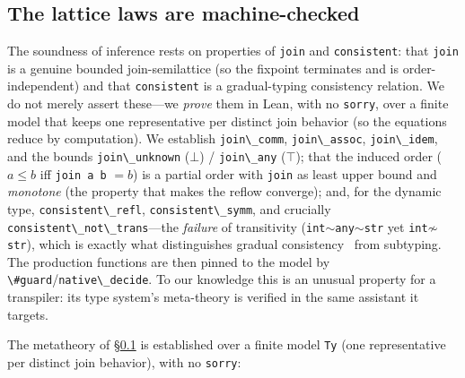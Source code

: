 \documentclass{article}
\newcommand{\code}{\lstinline}
\begin{document}
{\subsection{The lattice laws are machine-checked}
\label{sec:latticeproof}
The soundness of inference rests on properties of \code{join} and \code{consistent}: that
\code{join} is a genuine bounded join-semilattice (so the fixpoint terminates and is
order-independent) and that \code{consistent} is a gradual-typing consistency relation. We do not
merely assert these---we \emph{prove} them in Lean, with no \code{sorry}, over a finite model that keeps one representative per distinct
join behavior (so the equations reduce by computation). We establish \code{join\_comm},
\code{join\_assoc}, \code{join\_idem}, and the bounds \code{join\_unknown} ($\bot$) /
\code{join\_any} ($\top$); that the induced order ($a\le b$ iff \code{join a b} $=b$) is a partial
order with \code{join} as least upper bound and \emph{monotone} (the property that makes the
reflow converge); and, for the dynamic type, \code{consistent\_refl}, \code{consistent\_symm}, and
crucially \code{consistent\_not\_trans}---the \emph{failure} of transitivity
(\code{int}$\sim$\code{any}$\sim$\code{str} yet \code{int}$\not\sim$\code{str}), which is exactly
what distinguishes gradual consistency~\cite{siek2006gradual} from subtyping. The production
functions are then pinned to the model by \code{\#guard}/\code{native\_decide}. To our knowledge
this is an unusual property for a transpiler: its type system's meta-theory is verified in the
same assistant it targets.

The metatheory of \S\ref{sec:latticeproof} is established over a
finite model \code{Ty} (one representative per distinct join behavior), with no \code{sorry}:

}
\end{document}
